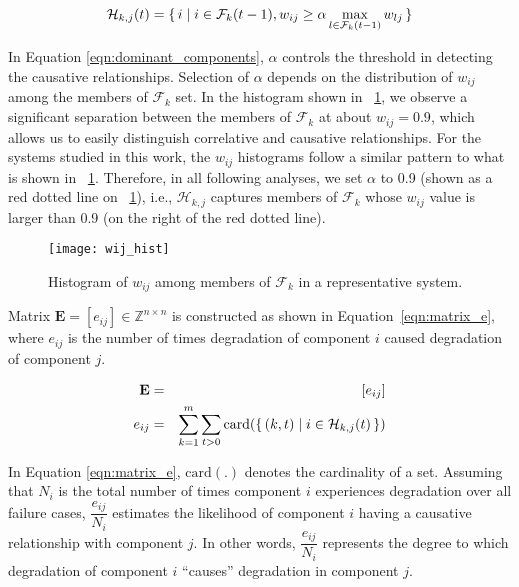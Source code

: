 \documentclass[12pt]{elsarticle}
\begin{document}
\begin{equation}
\label{eqn:dominant_components}
\mathcal{H}_{k, j}(t) = \set{i | i \in \mathcal{F}_{k}(t - 1), w_{ij} \geq \alpha \max\limits_{l \in \mathcal{F}_{k}(t - 1)} w_{lj}}
\end{equation}

In Equation \eqref{eqn:dominant_components}, $\alpha$ controls the threshold in detecting the causative relationships. Selection of $\alpha$ depends on the distribution of $w_{ij}$ among the members of $\mathcal{F}_{k}$ set. In the histogram shown in \figurename~\ref{wij_hist}, we observe a significant separation between the members of $\mathcal{F}_{k}$ at about $w_{ij} = 0.9$, which allows us to easily distinguish correlative and causative relationships. For the systems studied in this work, the $w_{ij}$ histograms follow a similar pattern to what is shown in \figurename~\ref{wij_hist}. Therefore, in all following analyses, we set $\alpha$ to 0.9 (shown as a red dotted line on \figurename~\ref{wij_hist}), i.e., $\mathcal{H}_{k, j}$ captures members of $\mathcal{F}_{k}$ whose $w_{ij}$ value is larger than 0.9 (on the right of the red dotted line).

\begin{figure}
\centering
\texttt{[image: wij\_hist]}
\caption{Histogram of $w_{ij}$ among members of $\mathcal{F}_{k}$ in a representative system.}
\label{wij_hist}
\end{figure}

Matrix $\mathbf{E} = \left[e_{ij}\right] \in \mathbb{Z}^{n \times n}$ is constructed as shown in Equation~\eqref{eqn:matrix_e}, where $e_{ij}$ is the number of times degradation of component $i$ caused degradation of component $j$.

\begin{eqnarray}
\label{eqn:matrix_e}
\mathbf{E} &=& \left[e_{ij}\right] \nonumber \\
e_{ij} &=& \sum\limits_{k=1}^{m} \sum\limits_{t > 0} \text{card}({\set{(k, t) |i \in \mathcal{H}_{k, j}(t)}})
\end{eqnarray}

In Equation \eqref{eqn:matrix_e}, $\text{card}(.)$ denotes the cardinality of a set. Assuming that $N_i$ is the total number of times component $i$ experiences degradation over all failure cases, $\dfrac{e_{ij}}{N_i}$ estimates the likelihood of component $i$ having a causative relationship with component $j$. In other words, $\dfrac{e_{ij}}{N_i}$ represents the degree to which degradation of component $i$ ``causes'' degradation in component $j$.
\end{document}
